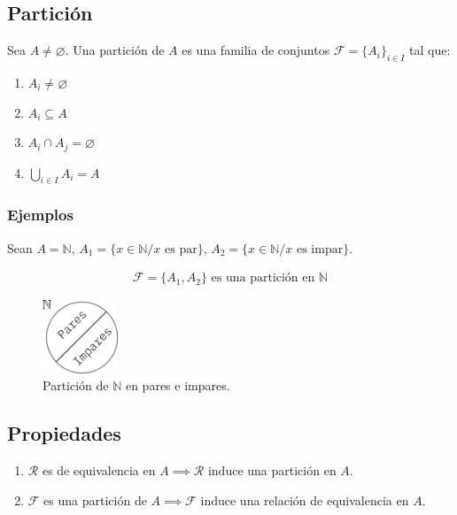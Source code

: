 \subsection{Partición}

Sea $A \neq \varnothing$. Una partición de $A$ es una familia de conjuntos
$\mathcal{F} = \{ A_i \}_{i \in I}$ tal que:

\begin{enumerate}
    \item $A_i \neq \varnothing$ %
    \item $A_i \subseteq A$ %
    \item $A_i \cap A_j = \varnothing$ %
    \item $\bigcup_{i \in I} A_i = A$
\end{enumerate}

\subsubsection{Ejemplos}

Sean $A = \mathbb{N}$, $A_1 = \{ x \in \mathbb{N} / x \text{ es par} \}$,
$A_2 = \{ x \in \mathbb{N} / x \text{ es impar} \}$.

\begin{gather*}
    \mathcal{F} = \{ A_1, A_2 \} \text{ es una partición en } \mathbb{N} 
\end{gather*}


\begin{figure}[H]
    \centering
    \includegraphics[width=0.20\textwidth]{particion_n_pares_impares}
    \caption{Partición de $\mathbb{N}$ en pares e impares.}
\end{figure}

\subsection{Propiedades}

\begin{enumerate}
    \item $\mathcal{R}$ es de equivalencia en $A \implies \mathcal{R}$ induce
        una partición en $A$.
    \item $\mathcal{F}$ es una partición de $A \implies \mathcal{F}$ induce
        una relación de equivalencia en $A$.
\end{enumerate}

